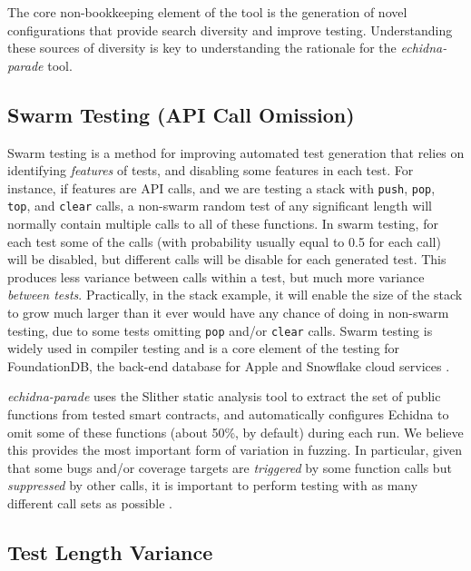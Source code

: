 \documentclass[sigconf]{acmart}
\begin{document}
{The core non-bookkeeping element of the tool is the generation of
novel configurations that provide search diversity and improve
testing.  Understanding these sources of diversity is key to
understanding the rationale for the \emph{echidna-parade} tool.

\subsection{Swarm Testing (API Call Omission)}

Swarm testing \cite{ISSTA12} is a method for improving automated test
generation that relies on identifying \emph{features} of tests, and
disabling some features in each test.  For instance, if features are
API calls, and we are testing a stack with {\tt push}, {\tt pop}, {\tt
  top}, and {\tt clear} calls, a non-swarm random test of any
significant length will normally contain multiple calls to all of
these functions.  In swarm testing, for each test some of the calls
(with probability usually equal to 0.5 for each call) will be
disabled, but different calls will be disable for each generated
test.  This produces less variance between calls within a test, but
much more variance \emph{between tests}.  Practically, in the stack
example, it will enable the size of the stack to grow much larger than
it ever would have any chance of doing in non-swarm testing, due to
some tests omitting {\tt pop} and/or {\tt clear} calls.  Swarm testing
is widely used in compiler testing
\cite{le2014compiler,dewey2015fuzzing} and is a core element of the
testing for FoundationDB, the back-end database for Apple and
Snowflake cloud services \cite{zhou2021foundationdb}.

\emph{echidna-parade} uses the Slither static analysis tool to extract
the set of public functions from tested smart contracts, and
automatically configures Echidna to omit some of these functions
(about 50\%, by default)
during each run.  We believe this provides the most important form of variation
in fuzzing.  In particular, given that some bugs and/or coverage
targets are \emph{triggered} by some function calls but
\emph{suppressed} by other calls, it is important to perform testing
with as many different call sets as possible \cite{groce2013help}.

\subsection{Test Length Variance}

}
\end{document}
